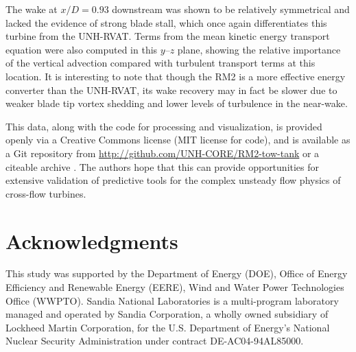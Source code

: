 \documentclass[10pt,letterpaper]{article}
\begin{document}
The wake at $x/D=0.93$ downstream was shown to be relatively symmetrical and
lacked the evidence of strong blade stall, which once again differentiates this
turbine from the UNH-RVAT. Terms from the mean kinetic energy transport equation
were also computed in this $y$--$z$ plane, showing the relative importance of
the vertical advection compared with turbulent transport terms at this location.
It is interesting to note that though the RM2 is a more effective energy
converter than the UNH-RVAT, its wake recovery may in fact be slower due to
weaker blade tip vortex shedding and lower levels of turbulence in the
near-wake.

This data, along with the code for processing and visualization, is provided
openly via a Creative Commons license (MIT license for code), and is available
as a Git repository from \url{http://github.com/UNH-CORE/RM2-tow-tank} or a
citeable archive \cite{Bachant2015-RM2-data}. The authors hope that this can
provide opportunities for extensive validation of predictive tools for the
complex unsteady flow physics of cross-flow turbines.


\section*{Acknowledgments}

This study was supported by the Department of Energy (DOE), Office of Energy
Efficiency and Renewable Energy (EERE), Wind and Water Power Technologies Office
(WWPTO). Sandia National Laboratories is a multi-program laboratory managed and
operated by Sandia Corporation, a wholly owned subsidiary of Lockheed Martin
Corporation, for the U.S. Department of Energy's National Nuclear Security
Administration under contract DE-AC04-94AL85000.

\nolinenumbers

%


\end{document}
